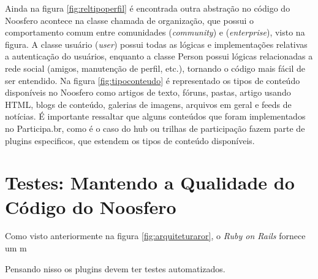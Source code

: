 Ainda na figura \ref{fig:reltipoperfil} é encontrada outra abstração no código do Noosfero acontece na classe chamada de organização, que possui o comportamento comum entre comunidades (\textit{community}) e (\textit{enterprise}), visto na figura. A classe usuário (\textit{user}) possui todas as lógicas e implementações relativas a autenticação do usuários, enquanto a classe Person possui lógicas relacionadas a rede social (amigos, manutenção de perfil, etc.), tornando o código mais fácil de ser entendido. Na figura \ref{fig:tipoconteudo} é representado os tipos de conteúdo disponíveis no Noosfero como artigos de texto, fóruns, pastas, artigo usando HTML, blogs de conteúdo, galerias de imagens, arquivos em geral e feeds de notícias. É importante ressaltar que alguns conteúdos que foram implementados no Participa.br, como é o caso do hub ou trilhas de participação fazem parte de plugins especificos, que estendem os tipos de conteúdo disponíveis.

\section{Testes: Mantendo a Qualidade do Código do Noosfero}
\label{sub:noosferotestes}

Como visto anteriormente na figura \ref{fig:arquiteturaror}, o \textit{Ruby on Rails} fornece um m

Pensando nisso os plugins devem ter testes automatizados. 



